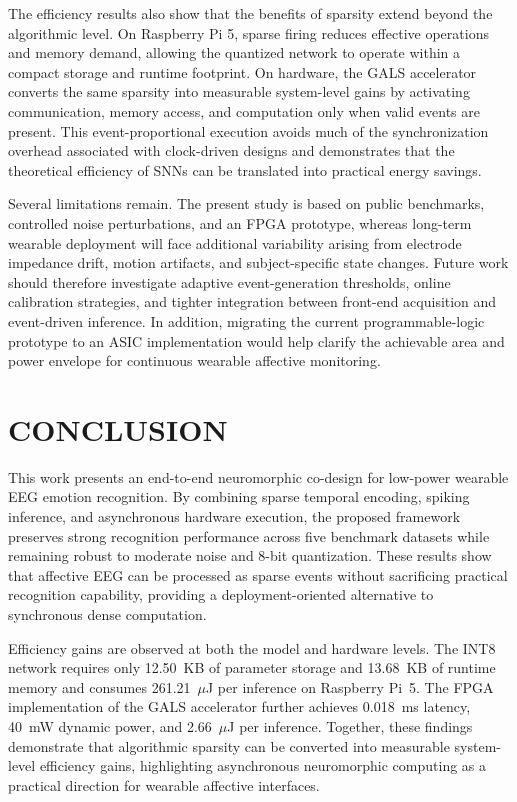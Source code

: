 \documentclass{nsr}
\begin{document}
The efficiency results also show that the benefits of sparsity extend beyond the algorithmic level. On Raspberry Pi 5, sparse firing reduces effective operations and memory demand, allowing the quantized network to operate within a compact storage and runtime footprint. On hardware, the GALS accelerator converts the same sparsity into measurable system-level gains by activating communication, memory access, and computation only when valid events are present. This event-proportional execution avoids much of the synchronization overhead associated with clock-driven designs and demonstrates that the theoretical efficiency of SNNs can be translated into practical energy savings.

Several limitations remain. The present study is based on public benchmarks, controlled noise perturbations, and an FPGA prototype, whereas long-term wearable deployment will face additional variability arising from electrode impedance drift, motion artifacts, and subject-specific state changes. Future work should therefore investigate adaptive event-generation thresholds, online calibration strategies, and tighter integration between front-end acquisition and event-driven inference. In addition, migrating the current programmable-logic prototype to an ASIC implementation would help clarify the achievable area and power envelope for continuous wearable affective monitoring.

\section{CONCLUSION}
This work presents an end-to-end neuromorphic co-design for low-power wearable EEG emotion recognition. By combining sparse temporal encoding, spiking inference, and asynchronous hardware execution, the proposed framework preserves strong recognition performance across five benchmark datasets while remaining robust to moderate noise and 8-bit quantization. These results show that affective EEG can be processed as sparse events without sacrificing practical recognition capability, providing a deployment-oriented alternative to synchronous dense computation.

Efficiency gains are observed at both the model and hardware levels. The INT8 network requires only 12.50~KB of parameter storage and 13.68~KB of runtime memory and consumes 261.21~$\mu$J per inference on Raspberry Pi~5. The FPGA implementation of the GALS accelerator further achieves 0.018~ms latency, 40~mW dynamic power, and 2.66~$\mu$J per inference. Together, these findings demonstrate that algorithmic sparsity can be converted into measurable system-level efficiency gains, highlighting asynchronous neuromorphic computing as a practical direction for wearable affective interfaces.
\end{document}
